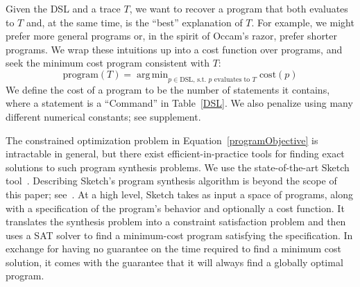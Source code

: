 \documentclass{article}
\DeclareMathOperator*{\argmin}{arg\,min} %
\newcommand{\remark}[1]{\textcolor{red}{[#1]}}
\begin{document}
Given the DSL and a trace $T$, we want to recover a program that both evaluates to $T$
and, at the same time, is the ``best'' explanation of $T$.
For example, we might prefer more general programs or, in the spirit of Occam's razor,
prefer shorter programs.
We wrap these intuitions up into a cost function over programs,
and seek the minimum cost program consistent with $T$:
\begin{equation}
  \text{program}(T) = \argmin_{p\in \text{DSL, s.t. }p \text{ evaluates to } T} \text{cost}(p)\label{programObjective}
\end{equation}
We define the
cost of a program to be the number of statements it contains, where a
statement is a ``Command'' in Table~\ref{DSL}.
We also penalize using many different numerical constants; see supplement.

The constrained optimization problem in
Equation~\ref{programObjective} is intractable in general, but there
exist efficient-in-practice tools for finding exact solutions to such
program synthesis problems. We use the state-of-the-art Sketch
tool~\cite{solar2008program}. Describing Sketch's program synthesis
algorithm is beyond the scope of this paper; see~\cite{solar2008program}.  At a
high level, Sketch takes as input a space of programs, along with a
specification of the program's behavior and optionally a cost
function.  It translates the synthesis problem into a constraint
satisfaction problem and then uses a SAT solver to find a
minimum-cost program satisfying the specification.  In exchange for
having no guarantee on the time required to find a minimum
cost solution, it comes with the guarantee that it will always find a
globally optimal program.
\end{document}
